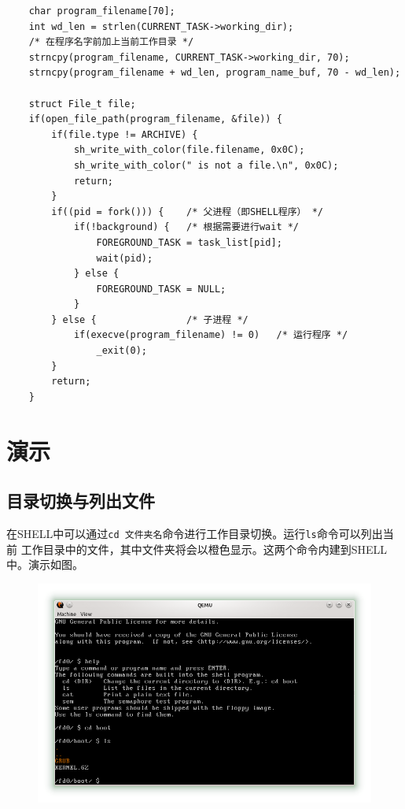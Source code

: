 \documentclass[a4paper, adobefonts]{ctexart}
\begin{document}
\begin{verbatim}
    char program_filename[70];
    int wd_len = strlen(CURRENT_TASK->working_dir);
    /* 在程序名字前加上当前工作目录 */
    strncpy(program_filename, CURRENT_TASK->working_dir, 70);
    strncpy(program_filename + wd_len, program_name_buf, 70 - wd_len);

    struct File_t file;
    if(open_file_path(program_filename, &file)) {
        if(file.type != ARCHIVE) {
            sh_write_with_color(file.filename, 0x0C);
            sh_write_with_color(" is not a file.\n", 0x0C);
            return;
        }
        if((pid = fork())) {    /* 父进程（即SHELL程序） */
            if(!background) {   /* 根据需要进行wait */
                FOREGROUND_TASK = task_list[pid];
                wait(pid);
            } else {
                FOREGROUND_TASK = NULL;
            }
        } else {                /* 子进程 */
            if(execve(program_filename) != 0)   /* 运行程序 */
                _exit(0);
        }
        return;
    }
\end{verbatim}

\section{演示}
\subsection{目录切换与列出文件}
在SHELL中可以通过\verb|cd 文件夹名|命令进行工作目录切换。运行\verb|ls|命令可以列出当前
工作目录中的文件，其中文件夹将会以橙色显示。这两个命令内建到SHELL中。演示如图。

\begin{figure}[htp!]
    \center\includegraphics[scale=0.72]{1.png}
\end{figure}
\end{document}
